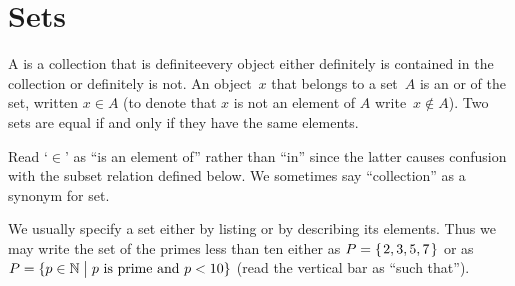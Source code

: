 \documentclass{test}  %
\begin{document}
\begin{problem}
\end{problem}










\chapter{Sets}
\begin{df}
A  is a collection that is definite\Dash every 
object either
definitely is contained in the collection or definitely is not.
An object~$x$ that belongs to a set~$A$ is an 
or 
of the set, written $x\in A$
(to denote that $x$ is not an element of $A$ write~$x\notin A$).
Two sets are equal if and only if they have the same elements.
\end{df}
\noindent Read `$\in$' as ``is an element of'' rather than ``in'' since the 
latter causes confusion with 
the subset relation defined below.
We sometimes say ``collection'' as a synonym for set.

We usually specify a set either by listing or by
describing its elements.
Thus we may write 
the set of the primes less than ten either 
as $P=\mbox{$\{\hspace{0.1em}2, 3, 5, 7\hspace{0.1em}\}$}$ 
or as~$P=\{p\in\mathbb{N} \bigm| \text{$p$ is prime and $p<10$}\}$ 
(read the vertical bar as ``such that'').
\end{document}
